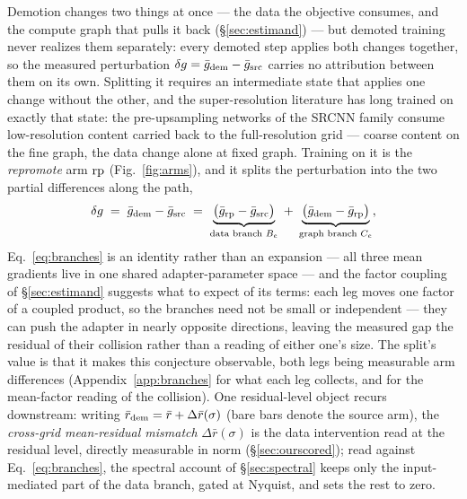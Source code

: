 Demotion changes two things at once --- the data the objective
consumes, and the compute graph that pulls it back
(\S\ref{sec:estimand}) --- but demoted training never realizes them
separately: every demoted step applies both changes together, so the
measured perturbation $\delta g = \bar g_{\mathrm{dem}} - \bar g_{\mathrm{src}}$
carries no attribution between them on its own. Splitting it
requires an intermediate state that applies one change without the
other, and the super-resolution literature has long trained on
exactly that state: the pre-upsampling networks of the SRCNN family
\citep{dong2016srcnn,kim2016vdsr} consume low-resolution content
carried back to the full-resolution grid --- coarse content on the
fine graph, the data change alone at fixed graph. Training on it is
the \emph{repromote} arm $\mathrm{rp}$ (Fig.~\ref{fig:arms}), and it splits
the perturbation into the two partial differences along the path,
\begin{equation}
\delta g \;=\; \bar g_{\mathrm{dem}} - \bar g_{\mathrm{src}}
\;=\;
\underbrace{\big(\bar g_{\mathrm{rp}} - \bar g_{\mathrm{src}}\big)}_{\text{data branch }B_e}
\;+\;
\underbrace{\big(\bar g_{\mathrm{dem}} - \bar g_{\mathrm{rp}}\big)}_{\text{graph branch }C_e},
\label{eq:branches}
\end{equation}
Eq.~\ref{eq:branches} is an identity rather than an expansion ---
all three mean gradients live in one shared adapter-parameter space
--- and the factor coupling of \S\ref{sec:estimand} suggests what to
expect of its terms: each leg moves one factor of a coupled product,
so the branches need not be small or independent --- they can push
the adapter in nearly opposite directions, leaving the measured gap
the residual of their collision rather than a reading of either
one's size. The split's value is that it makes this conjecture
observable, both legs being measurable arm differences
(Appendix~\ref{app:branches} for what each leg collects, and for the
mean-factor reading of the collision). One residual-level object
recurs downstream: writing
$\bar r_{\mathrm{dem}} = \bar r + \Delta\bar r(\sigma)$ (bare bars denote
the source arm), the \emph{cross-grid mean-residual mismatch}
$\Delta\bar r(\sigma)$ is the data intervention read at the residual
level, directly measurable in norm (\S\ref{sec:ourscored}); read
against Eq.~\ref{eq:branches}, the spectral account of
\S\ref{sec:spectral} keeps only the input-mediated part of the data
branch, gated at Nyquist, and sets the rest to zero.


